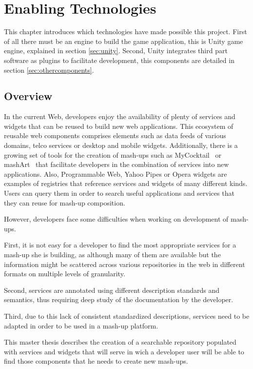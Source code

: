 
\chapter{Enabling Technologies}
\label{chap:enabling_technologies}
\begin{chapterintro}
This chapter introduces which technologies have made possible this project. First of all there must be an engine to build the game application, this is Unity game engine, explained in section \ref{sec:unity}. Second, Unity integrates third part software as plugins to facilitate development, this components are detailed in section \ref{sec:othercomponents}.
\end{chapterintro}

\cleardoublepage
\section{Overview}
In the current Web, developers enjoy the availability of plenty of services and widgets that can be reused to build new web applications. This ecosystem of reusable web components comprises elements such as data feeds of various domains, telco services or desktop and mobile widgets. Additionally, there is a growing set of tools for the creation of mash-ups such as MyCocktail~\cite{iglesias2011combining} or mashArt~\cite{daniel2009hosted} that facilitate developers in the combination of services into new applications. Also, Programmable Web, Yahoo Pipes or Opera widgets are examples of registries that reference services and widgets of many different kinds. Users can query them in order to search useful applications and services that they can reuse for mash-up composition.

However, developers face some difficulties when working on development of mash-ups. 

First, it is not easy for a developer to find the most appropriate services for a mash-up she is building, as although many of them are available but the information might be scattered across various repositories in the web in different formats on multiple levels of granularity.

Second, services are annotated using different description standards and semantics, thus requiring deep study of the documentation by the developer.

Third, due to this lack of consistent standardized descriptions, services need to be adapted in order to be used in a mash-up platform. 

This master thesis describes the creation of a searchable repository populated with services and widgets that will serve in wich a developer user will be able to find those components that he needs to create new mash-ups.

